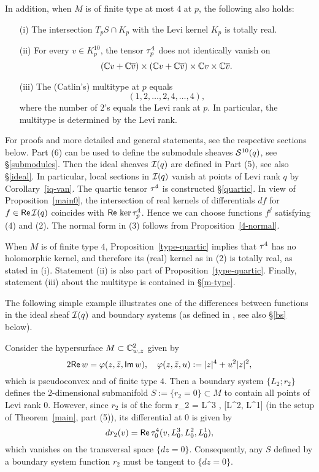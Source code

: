 \documentclass[12pt]{amsart}
\begin{document}
In addition, when $M$ is of finite type at most $4$ at $p$,
the following also holds:


\begin{enumerate}

\item[(i)]
The intersection $T_p S\cap K_p$ with the Levi kernel $K_p$ is totally real.
\item[(ii)]
For every $v\in K^{10}_p$, the tensor $\tau^4_p$ does not identically 
vanish on
$$
	({\mathbb{C}} v + {\mathbb{C}} \overline{v}) \times ({\mathbb{C}} v + {\mathbb{C}} \overline{v}) \times {\mathbb{C}} v\times {\mathbb{C}} \overline{v}.
$$
\item[(iii)]
The (Catlin's) multitype at $p$ equals
$$
	(1,2,\ldots, 2, 4,\ldots, 4),
$$
where the number of $2$'s equals the Levi rank at $p$.
In particular, the multitype is determined by the Levi rank.

\end{enumerate}
\et

For proofs and more detailed and general statements,
see the respective sections below.
Part (6) can be used to define 
the submodule sheaves ${\mathcal{S}}^{10}(q)$,
see \S\ref{submodules}.
Then the ideal sheaves ${\mathcal{I}}(q)$ are defined in Part (5),
see also \S\ref{ideal}.
In particular, local sections in ${\mathcal{I}}(q)$
vanish at points of Levi rank $q$
by Corollary~\ref{iq-van}.
The quartic tensor $\tau^4$ is constructed 
\S\ref{quartic}.
In view of Proposition~\ref{main0},
the intersection of real kernels of differentials
$df$ for $f\in {\sf Re}\, {\mathcal{I}}(q)$ coincides
with ${\sf Re}\, \ker \tau^4_p$.
Hence we can choose functions $f^j$
satisfying (4) and (2).
The normal form in (3) 
follows from Proposition~\ref{4-normal}.

When $M$ is of finite type $4$,
Proposition~\ref{type-quartic}
implies that $\tau^4$
has no holomorphic kernel,
and therefore its (real) kernel as in (2) is totally real,
as stated in (i).
Statement (ii) is also part of Proposition~\ref{type-quartic}.
Finally, statement (iii) about the multitype 
is contained in \S\ref{m-type}.

\bigskip

The following simple example
illustrates one of the differences between
functions in the ideal sheaf ${\mathcal{I}}(q)$
and  boundary systems
(as defined in \cite[\S2]{C84b},
see also \S\ref{bs} below).

\be{}
Consider the hypersurface
$M\subset{\mathbb{C}}^2_{w,z}$ given by
$$
	2{\sf Re}\, w = \varphi(z,{\bar z}, {\sf Im}\, w), \quad 
	\varphi(z,{\bar z},u):= |z|^4 + u^2|z|^2,
$$
which is pseudoconvex and of finite type $4$.
Then a boundary system $\{ L_2; r_2\}$
%
defines the  $2$-dimensional
submanifold $S:=\{ r_2 =0\} \subset M$
to contain all points of Levi rank $0$.
However, since $r_2$ is of the form
\beq{}
	r_2 = \Re L^3 \la \th, [L^2, L^1]\ra
\eeq
(in the setup of Theorem~\ref{main}, part (5)),
its differential at $0$ is given by
$$
	d r_2 (v) = {\sf Re}\, \tau^4_0 (v, L^3_0, L^2_0, L^1_0),
$$
which vanishes on the transversal space $\{dz=0\}$.
Consequently, any $S$ defined by a boundary system function $r_2$
must be tangent to $\{dz=0\}$.
\end{document}
